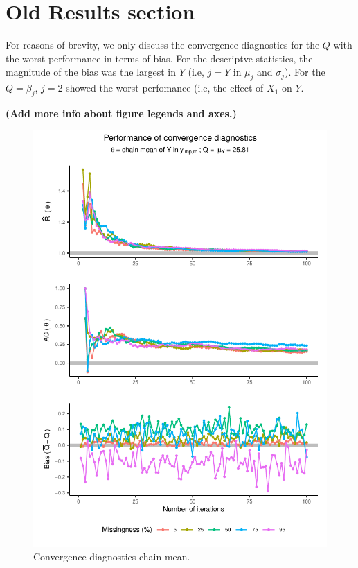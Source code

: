 \documentclass[Royal,times,sageh]{sagej}
\begin{document}
\hypertarget{old-results-section}{%
\section{Old Results section}\label{old-results-section}}

For reasons of brevity, we only discuss the convergence diagnostics for
the \(Q\) with the worst performance in terms of bias. For the
descriptve statistics, the magnitude of the bias was the largest in
\(Y\) (i.e, \(j = Y\) in \(\mu_j\) and \(\sigma_j\)). For the
\(Q=\beta_j\), \(j=2\) showed the worst perfomance (i.e, the effect of
\(X_1\) on \(Y\).

\textbf{(Add more info about figure legends and axes.)}

\begin{figure}

{\centering \includegraphics{manuscript_files/figure-latex/mean-1} 

}

\caption{Convergence diagnostics chain mean.}\label{fig:mean}
\end{figure}
\end{document}
